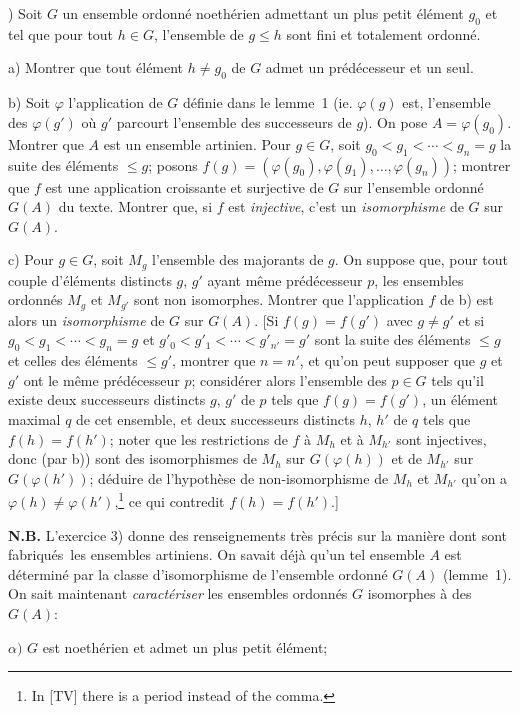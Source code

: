 \documentclass[12pt]{article}
\newcommand{\nn}{\noindent}
\begin{document}
\nn3) Soit $G$ un ensemble ordonné noethérien admettant un plus petit élément $g_0$ et tel que pour tout $h\in G$, l'ensemble de $g\leq h$ sont fini et totalement ordonné.

a) Montrer que tout élément $h\neq g_0$ de $G$ admet un prédécesseur et un seul.

b) Soit $\varphi$ l'application de $G$ définie dans le lemme~1 (ie. $\varphi(g)$ est, l'ensemble des $\varphi(g')$ où $g'$ parcourt l'ensemble des successeurs de $g$). On pose $A=\varphi(g_0)$. Montrer que $A$ est un ensemble artinien. Pour $g\in G$, soit $g_0 < g_1 < \cdots < g_n=g$ la suite des éléments $\leq g$; posons $f(g)=(\varphi(g_0),\varphi(g_1),\ldots,\varphi(g_n))$; montrer que $f$ est une application croissante et surjective de $G$ sur l'ensemble ordonné $G(A)$ du texte. Montrer que, si $f$ est \emph{injective}, c'est un \emph{isomorphisme} de $G$ sur $G(A)$.

c) Pour $g\in G$, soit $M_g$ l'ensemble des majorants de $g$. On suppose que, pour tout couple d'éléments distincts $g$, $g'$ ayant même prédécesseur $p$, les ensembles ordonnés $M_g$ et $M_{g'}$ sont non isomorphes. Montrer que l'application $f$ de b) est alors un \emph{isomorphisme} de $G$ sur $G(A)$. [Si $f(g)=f(g')$ avec $g\neq g'$ et si $g_0 < g_1 < \cdots < g_n=g$ et $g'_0 < g'_1 < \cdots  < g'_{n'}=g'$ sont la suite des éléments $\leq g$ et celles des éléments $\leq g'$, montrer que $n=n'$, et qu'on peut supposer que $g$ et $g'$ ont le même prédécesseur $p$; considérer alors l'ensemble des $p\in G$ tels qu'il existe deux successeurs distincts $g$, $g'$ de $p$ tels que $f(g)=f(g')$, un élément maximal $q$ de cet ensemble, et deux successeurs distincts $h$, $h'$ de $q$ tels que $f(h)=f(h')$; noter que les restrictions de $f$ à $M_h$ et à $M_{h'}$ sont injectives, donc (par b)) sont des isomorphismes de $M_h$ sur $G(\varphi(h))$ et de $M_{h'}$ sur $G(\varphi(h'))$; déduire de l'hypothèse de non-isomorphisme de $M_h$ et $M_{h'}$ qu'on a $\varphi(h)\neq \varphi(h')$,\footnote{In [TV] there is a period instead of the comma.} ce qui contredit $f(h)=f(h')$.]

\textbf{N.B.} L'exercice 3) donne des renseignements très précis sur la manière dont sont \og fabriqués\fg\ les ensembles artiniens. On savait déjà qu'un tel ensemble $A$ est déterminé par la classe d'isomorphisme de l'ensemble ordonné $G(A)$ (lemme~1). On sait maintenant \emph{caractériser} les ensembles ordonnés $G$ isomorphes à des $G(A)$: 

$\alpha)$ $G$ est noethérien et admet un plus petit élément;
\end{document}
